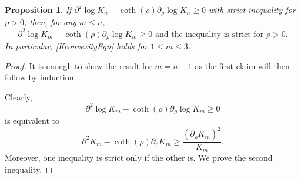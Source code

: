 \documentclass{amsart}
\newtheorem{prop}[thm]{Proposition}
\theoremstyle{definition}
\theoremstyle{remark}
\numberwithin{equation}{section}
\begin{document}
\begin{prop}\label{KnProp}
	If $\partial^2 \log K_n -\coth(\rho) \partial_\rho \log K_n \geq 0$ with strict inequality for $\rho>0$, then, for any $m\leq n$,
    \begin{equation}\label{KconvexityEqn}
	\partial^2 \log K_m -\coth(\rho) \partial_\rho \log K_m \geq 0 \mbox{ and the inequality is strict for $\rho>0$}.
	\end{equation} 
	In particular, \eqref{KconvexityEqn} holds for $1\leq m \leq 3$.
\end{prop}
\begin{proof}
	It is enough to show the result for $m=n-1$ as the first claim will then follow by induction.
	
	
  Clearly,
	$$
	\partial^2 \log K_m -\coth(\rho) \partial_\rho \log K_m \geq 0
	$$
	is equivalent to 
	$$
	\partial^2  K_m -\coth(\rho) \partial_\rho K_m \geq \frac{(\partial_\rho K_m)^2}{K_m}.
	$$
	Moreover, one inequality is strict only if the other is.
	We prove the second inequality.
	

\end{proof}
\end{document}
